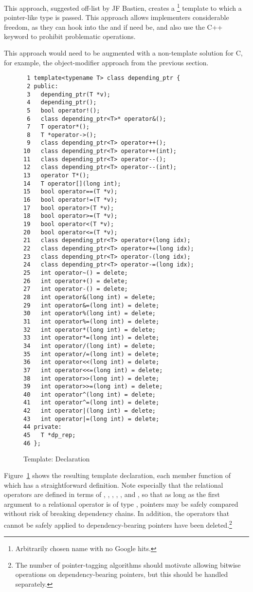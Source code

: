 This approach, suggested off-list by JF Bastien, creates a
\footnote{
	Arbitrarily chosen name with no Google hits.}
template to which a pointer-like type is passed.
This approach allows implementers considerable freedom, as they can
hook into the \co{->} and \co{*} if need be, and also use the C++
 keyword to prohibit problematic operations.

This approach would need to be augmented with a non-template solution
for C, for example, the object-modifier approach from
the previous section.

\begin{figure}[tbp]
{ \scriptsize
\begin{verbatim}
 1 template<typename T> class depending_ptr {
 2 public:
 3   depending_ptr(T *v);
 4   depending_ptr();
 5   bool operator!();
 6   class depending_ptr<T>* operator&();
 7   T operator*();
 8   T *operator->();
 9   class depending_ptr<T> operator++();
10   class depending_ptr<T> operator++(int);
11   class depending_ptr<T> operator--();
12   class depending_ptr<T> operator--(int);
13   operator T*();
14   T operator[](long int);
15   bool operator==(T *v);
16   bool operator!=(T *v);
17   bool operator>(T *v);
18   bool operator>=(T *v);
19   bool operator<(T *v);
20   bool operator<=(T *v);
21   class depending_ptr<T> operator+(long idx);
22   class depending_ptr<T> operator+=(long idx);
23   class depending_ptr<T> operator-(long idx);
24   class depending_ptr<T> operator-=(long idx);
25   int operator~() = delete;
26   int operator+() = delete;
27   int operator-() = delete;
28   int operator&(long int) = delete;
29   int operator&=(long int) = delete;
30   int operator%(long int) = delete;
31   int operator%=(long int) = delete;
32   int operator*(long int) = delete;
33   int operator*=(long int) = delete;
34   int operator/(long int) = delete;
35   int operator/=(long int) = delete;
36   int operator<<(long int) = delete;
37   int operator<<=(long int) = delete;
38   int operator>>(long int) = delete;
39   int operator>>=(long int) = delete;
40   int operator^(long int) = delete;
41   int operator^=(long int) = delete;
42   int operator|(long int) = delete;
43   int operator|=(long int) = delete;
44 private:
45   T *dp_rep;
46 };
\end{verbatim}
}
\caption{Template: Declaration}
\label{fig:Template: Declaration}
\end{figure}

Figure~\ref{fig:Template: Declaration}
shows the resulting template declaration, each member function of which
has a straightforward definition.
Note especially that the relational operators are defined in terms of
,
,
,
,
, and
,
so that as long as the first argument to a relational operator is of type
,
pointers may be safely compared without risk of breaking dependency chains.
In addition, the operators that cannot be safely applied to
dependency-bearing pointers have been deleted.\footnote{
	The number of pointer-tagging algorithms should motivate
	allowing bitwise operations on dependency-bearing
	pointers, but this should be handled separately.}

